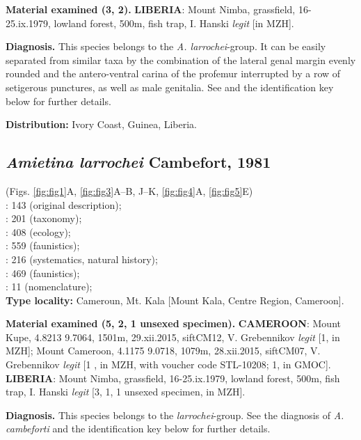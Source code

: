 \documentclass[fleqn,10pt,lineno]{wlpeerj}
\begin{document}
\textbf{Material examined (3\male\male, 2\female\female).} \textbf{LIBERIA}: Mount Nimba, grassfield, 16-25.ix.1979, lowland forest, 500m, fish trap, I. Hanski \textit{legit} [in MZH].

\textbf{Diagnosis.} This species belongs to the \textit{A. larrochei}-group. It can be easily separated from similar taxa by the combination of the lateral genal margin evenly rounded and the antero-ventral carina of the profemur interrupted by a row of setigerous punctures, as well as male genitalia. See \citep{branco1989deux} and the identification key below for further details.

\textbf{Distribution:} Ivory Coast, Guinea, Liberia.



\subsection*{\textbf{\textit{Amietina larrochei} Cambefort, 1981}}
(Figs. \ref{fig:fig1}A, \ref{fig:fig3}A--B, J--K, \ref{fig:fig4}A, \ref{fig:fig5}E)\\ 
\cite{cambefort1981amietina}: 143 (original description);\\
\cite{branco1989deux}: 201 (taxonomy);\\
\cite{cambefort1991dung}: 408 (ecology);\\
\cite{cambefort2003nimba}: 559 (faunistics);\\
\cite{davis2008african}: 216 (systematics, natural history);\\
\cite{moretto2010bayanga}: 469 (faunistics);\\
\cite{branco2014scarabaeidae}: 11 (nomenclature);\\

\textbf{Type locality:} Cameroun, Mt. Kala [Mount Kala, Centre Region, Cameroon].

\textbf{Material examined (5\male\male, 2\female\female, 1 unsexed specimen).} \textbf{CAMEROON}: Mount Kupe, 4.8213 9.7064, 1501m, 29.xii.2015, siftCM12, V. Grebennikov \textit{legit} [1\male, in MZH]; Mount Cameroon, 4.1175 9.0718, 1079m, 28.xii.2015, siftCM07, V. Grebennikov \textit{legit} [1 \female, in MZH, with voucher code STL-10208; 1\male, in GMOC]. \textbf{LIBERIA}: Mount Nimba, grassfield, 16-25.ix.1979, lowland forest, 500m, fish trap, I. Hanski \textit{legit} [3\male\male, 1\female, 1 unsexed specimen, in MZH].

\textbf{Diagnosis.} This species belongs to the \textit{larrochei}-group. See the diagnosis of \textit{A. cambeforti} and the identification key below for further details.
\end{document}
